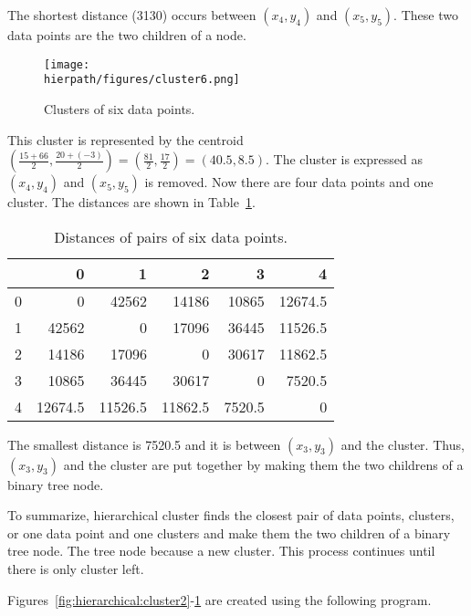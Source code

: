 The shortest distance (3130) occurs between $(x_4, y_4)$ and
$(x_5, y_5)$.  These two data points are the two children of a node.


\begin{figure}[h] \centering
{\texttt{[image: \\hierpath/figures/cluster6.png]}}
\caption{Clusters of six data points.}
\label{fig:hierarchical:cluster6}
\end{figure}

This cluster is represented by the centroid $(\frac{15 + 66}{2},
\frac{20 + (-3)}{2}) = (\frac{81}{2}, \frac{17}{2}) = (40.5, 8.5)$.
The cluster is expressed as $(x_4, y_4)$ and $(x_5, y_5)$ is removed.
Now there are four data points and one cluster. The distances
are shown in Table~\ref{table:hierarchical:distance6points}.

\begin{table}
  \begin{tt}
\begin{tabular}{|r|rrrrr|}  \hline
& 0 & 1 & 2 & 3 & 4  \\ \hline

0 & 0& 42562& 14186& 10865 & 12674.5\\
1 & 42562& 0& 17096& 36445 & 11526.5 \\
2 & 14186& 17096& 0& 30617 & 11862.5 \\
3 & 10865& 36445& 30617& 0 & 7520.5 \\
4 & 12674.5 & 11526.5 & 11862.5 & 7520.5 & 0 \\  \hline
\end{tabular}
  \end{tt}
  \caption{Distances of pairs of six data points.}
  \label{table:hierarchical:distance6points}
\end{table}

The smallest distance is 7520.5 and it is between $(x_3, y_3)$ and the
cluster. Thus, $(x_3, y_3)$ and the cluster are put together by making
them the two childrens of a binary tree node.

To summarize, hierarchical cluster finds the closest pair of data
points, clusters, or one data point and one clusters and make them the
two children of a binary tree node.  The tree node because a new
cluster. This process continues until there is only cluster left.

\clearpage

Figures~\ref{fig:hierarchical:cluster2}-\ref{fig:hierarchical:cluster6}
are created using the following program.

\resetlinenumber[1]
\linenumbers
\begin{tt}
  
\end{tt}
\nolinenumbers

